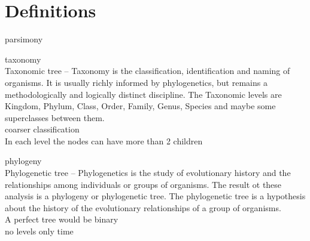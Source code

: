   \section{Definitions}
    \begin{definition} parsimony \cite{Cunningham1998}
    \end{definition}
    \begin{definition} taxonomy \\
      Taxonomic tree – Taxonomy is the classification, identification and naming of organisms. It is 
        usually richly informed by phylogenetics, but remains a methodologically and logically 
        distinct discipline. The Taxonomic levels are Kingdom, Phylum, Class, Order, Family, Genus, 
        Species and maybe some superclasses between them. \\
      coarser classification \\
      In each level the nodes can have more than 2 children
    \end{definition}
    \begin{definition} phylogeny \\
      Phylogenetic tree – Phylogenetics is the study of evolutionary history and the relationships 
        among individuals or groups of organisms. The result ot these analysis is a  phylogeny or 
        phylogenetic tree. The phylogenetic tree is a hypothesis about the history of the evolutionary 
        relationships of a group of organisms. \\
      A perfect tree would be binary \\
      no levels only time
    \end{definition}
